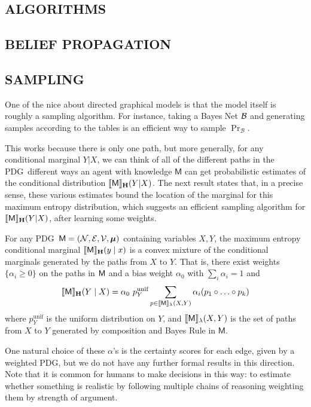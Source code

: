 \documentclass{article}
\newcommand\MaxEnt{_{\mathbf H}}
\newcommand{\sfM}{\mathsf M}
\newcommand{\MN}{PDG}
\numberwithin{equation}{section}
\begin{document}
\begin{notfocus}
	\section{ALGORITHMS}\label{sec:algorithms}
	\subsection{BELIEF PROPAGATION}
	
	
	\subsection{SAMPLING}
	
	One of the nice about directed graphical models is that the model itself is roughly a sampling algorithm. For instance, taking a Bayes Net $\cal B$ and generating samples according to the tables is an efficient way to sample $\Pr_{\mathcal B}$.

	This works because there is only one path, but more generally, for any conditional marginal $Y|X$, we can think of all of the different paths in the \MN\ different ways an agent with knowledge $\sfM$ can get probabilistic estimates of the conditional distribution $\bbr{\sfM}\MaxEnt(Y | X)$. The next result states that, in a precise sense, these various estimates bound the location of the marginal for this maximum entropy distribution, which suggests an efficient sampling algorithm for $\bbr{\sfM}\MaxEnt(Y | X)$, after learning some weights.
	
	\begin{conj}\label{thm:maxent-hull}
		For any \MN\ $\sfM = \mnvars[]$ containing variables $X, Y$, the maximum entropy conditional marginal $\bbr{\sfM}\MaxEnt(y \mid x)$ is a convex mixture of the conditional marginals generated by the paths from $X$ to $Y$.  That is, there exist weights $\{\alpha_i \geq 0\}$ on the paths in $\sf M$ and a bias weight $\alpha_0$ with $\sum_i {\alpha_i} = 1$ and
		$$ \bbr{\sfM}\MaxEnt(Y \mid X) = \alpha_0 \  p^{\text{unif}}_Y \sum_{p \in \bbr{\sfM}_\lambda(X, Y)} \alpha_i (p_1 \circ \ldots \circ p_k) $$		
		where $p^{\text{unif}}_Y$ is the uniform distribution on $Y$, and $\bbr{\sfM}_\lambda(X,Y)$ is the set of paths from $X$ to $Y$ generated by composition and Bayes Rule in $\sfM$. 
	\end{conj}

	One natural choice of these $\alpha$'s is the certainty scores for each edge, given by a weighted \MN, but we do not have any further formal results in this direction.
	Note that it is common for humans to make decisions in this way: to estimate whether something is realistic by following multiple chains of reasoning weighting them by strength of argument.
	

\end{notfocus}
\end{document}
